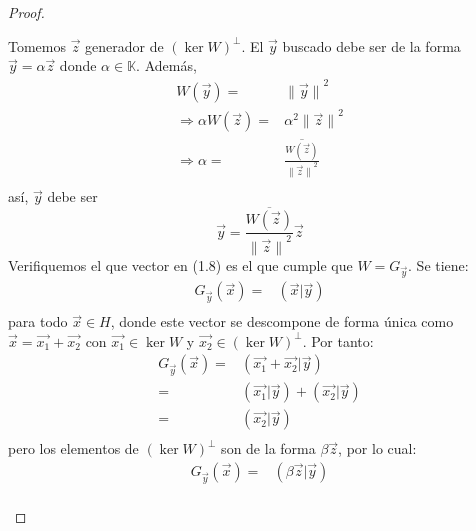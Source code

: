 \documentclass[12pt]{report}
\newcounter{it}
\theoremstyle{largebreak}
\newcommand\norm[1]{\ensuremath{\|#1\|}}
\newcommand\pint[2]{\ensuremath{\left(#1\big| #2\right)}}
\newcommand\conj[1]{\ensuremath{\overline{#1}}}
\begin{document}
\begin{proof}
\begin{enumerate}
            Tomemos $\vec{z}$ generador de $\left(\ker W\right)^\perp$. El $\vec{y}$ buscado debe ser de la forma $\vec{y}=\alpha\vec{z}$ donde $\alpha\in\mathbb{K}$. Además,
            \begin{equation*}
                \begin{split}
                    W(\vec{y})=&\norm{\vec{y}}^2\\
                    \Rightarrow \alpha W(\vec{z})=&\alpha^2\norm{\vec{z}}^2\\
                    \Rightarrow \alpha=&\conj{\frac{W(\vec{z})}{\norm{\vec{z}}^2}}\\
                \end{split}
            \end{equation*}
            así, $\vec{y}$ debe ser
            \begin{equation}
                \vec{y}=\conj{\frac{W(\vec{z})}{\norm{\vec{z}}^2}}\vec{z}
            \end{equation}
            Verifiquemos el que vector en (1.8) es el que cumple que $W=G_{\vec{y}}$. Se tiene:
            \begin{equation*}
                \begin{split}
                    G_{\vec{y}}(\vec{x})=&\pint{\vec{x}}{\vec{y}} \\
                \end{split}
            \end{equation*}
            para todo $\vec{x}\in H$, donde este vector se descompone de forma única como $\vec{x}=\vec{x_1}+\vec{x_2}$ con $\vec{x_1}\in\ker W$ y $\vec{x_2}\in\left(\ker W\right)^\perp$. Por tanto:
            \begin{equation*}
                \begin{split}
                    G_{\vec{y}}(\vec{x})=&\pint{\vec{x_1}+\vec{x_2}}{\vec{y}} \\
                    =&\pint{\vec{x_1}}{\vec{y}}+\pint{\vec{x_2}}{\vec{y}} \\
                    =&\pint{\vec{x_2}}{\vec{y}} \\
                \end{split}
            \end{equation*}
            pero los elementos de $\left(\ker W\right)^\perp$ son de la forma $\beta\vec{z}$, por lo cual:\begin{equation*}
                \begin{split}
                    G_{\vec{y}}(\vec{x})=&\pint{\beta\vec{z}}{\vec{y}} \\

\end{split}
\end{equation*}
\end{enumerate}
\end{proof}
\end{document}
